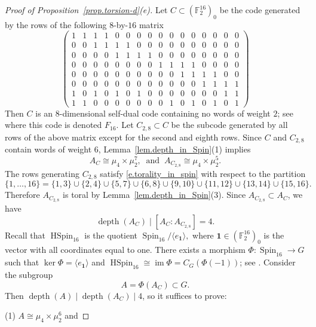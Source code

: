 \documentclass[12pt]{amsart}
\numberwithin{equation}{section}
\theoremstyle{remark}
\newcommand{\im}{\operatorname{im}}
\newcommand{\Spin}{\operatorname{Spin}}
\newcommand{\HSpin}{\operatorname{HSpin}}
\newcommand{\depth}{\operatorname{depth}}
\newcommand{\bF}{\mathbb{F}}
\begin{document}
\begin{proof}[Proof of Proposition~\ref{prop.torsion-d}(e)]
 Let $C \subset (\bF_2^{16})_0$ be the code generated by the rows of the following $8$-by-$16$ matrix
 \setcounter{MaxMatrixCols}{20}
 $$\begin{pmatrix}
     1 & 1 &1 &1& 0 & 0 & 0 & 0 & 0 & 0 & 0 & 0 & 0 & 0 & 0 & 0 \\
     0&0& 1 & 1 &1 &1&  0 & 0 & 0 & 0 & 0 & 0 & 0 & 0 & 0 & 0 \\
     0 & 0 & 0 & 0 & 1 & 1 &1 &1&  0 & 0 & 0 & 0 & 0 & 0 & 0 & 0 \\
     0 & 0 & 0 & 0 & 0 & 0 & 0 & 0 & 1 & 1 &1 &1& 0 & 0 & 0 & 0\\
      0 & 0 & 0 & 0 & 0 & 0 & 0 & 0 &0&0& 1 & 1 &1 &1&  0 & 0 \\
      0 & 0 & 0 & 0 & 0 & 0 & 0 & 0 & 0 & 0 & 0 & 0 & 1 & 1 &1 &1 \\
       1 & 0 & 1 & 0 & 1 & 0 & 1 & 0 & 0 & 0 & 0 & 0 & 0 & 0 &1 &1 \\
        1 & 1 & 0 & 0 & 0 & 0 & 0 & 0 & 0 & 1 & 0 & 1 & 0 & 1 &0 &1 
 \end{pmatrix}$$
 Then $C$ is an $8$-dimensional self-dual code containing no words of weight $2$; see \cite[Table 2]{pless1972classification} where this code is denoted $F_{16}$. Let $C_{2,8} \subset C$ be the subcode generated by all rows of the above matrix except for the second and eighth rows. Since $C$ and $C_{2,8}$ contain words of weight $6$, Lemma~\ref{lem.depth_in_Spin}(1) implies
 $$ A_C \cong \mu_4 \times \mu_2^7, \ \text{ and }\ A_{C_{2,8}} \cong \mu_4\times \mu_2^5.$$
 The rows generating $C_{2,8}$ satisfy \eqref{e.torality_in_spin} with respect to the partition $$\{1,\dots,16\}=\{1,3\}\cup\{2,4\}\cup\{5,7\}\cup\{6,8\}\cup\{9,10\}\cup\{11,12\}\cup\{13,14\}\cup\{15,16\}.$$ 
 Therefore $A_{C_{2,8}}$ is toral by Lemma~\ref{lem.depth_in_Spin}(3). Since $A_{C_{2,8}}\subset A_C$, we have
 $$\depth(A_C) \mid [A_C:A_{C_{2,8}}] = 4.$$
 Recall that $\HSpin_{16}$ is the quotient $ \Spin_{16}/\langle e_{\mathbf{1}}\rangle,$ where $\mathbf{1}\in (\bF_2^{16})_0$ is the vector with all coordinates equal to one.
There exists a morphism $\Phi\colon \Spin_{16} \to G$ such that $\ker\Phi = \langle e_{\mathbf{1}}\rangle$ and  $\HSpin_{16} \cong \im\Phi=C_G(\Phi(-1))$; see \cite[Example 4.3]{garibaldi2016E8}. Consider the subgroup
$$A  = \Phi(A_C) \subset G.$$
Then $\depth(A) \mid \depth(A_C) \mid 4$, so it suffices to prove:

\smallskip (1) $A\cong \mu_4\times \mu_2^6$  and


\end{proof}
\end{document}

